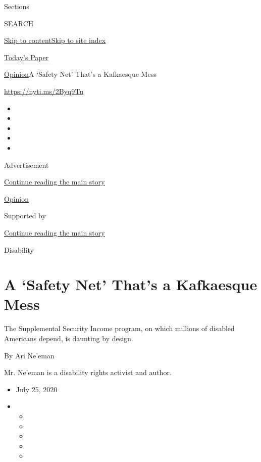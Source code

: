 Sections

SEARCH

\protect\hyperlink{site-content}{Skip to
content}\protect\hyperlink{site-index}{Skip to site index}

\href{https://myaccount.nytimes.com/auth/login?response_type=cookie\&client_id=vi}{}

\href{https://www.nytimes.com/section/todayspaper}{Today's Paper}

\href{/section/opinion}{Opinion}\textbar{}A `Safety Net' That's a
Kafkaesque Mess

\href{https://nyti.ms/2Byq9Tu}{https://nyti.ms/2Byq9Tu}

\begin{itemize}
\item
\item
\item
\item
\item
\end{itemize}

Advertisement

\protect\hyperlink{after-top}{Continue reading the main story}

\href{/section/opinion}{Opinion}

Supported by

\protect\hyperlink{after-sponsor}{Continue reading the main story}

Disability

\hypertarget{a-safety-net-thats-a-kafkaesque-mess}{%
\section{A `Safety Net' That's a Kafkaesque
Mess}\label{a-safety-net-thats-a-kafkaesque-mess}}

The Supplemental Security Income program, on which millions of disabled
Americans depend, is daunting by design.

By Ari Ne'eman

Mr. Ne'eman is a disability rights activist and author.

\begin{itemize}
\item
  July 25, 2020
\item
  \begin{itemize}
  \item
  \item
  \item
  \item
  \item
  \end{itemize}
\end{itemize}

